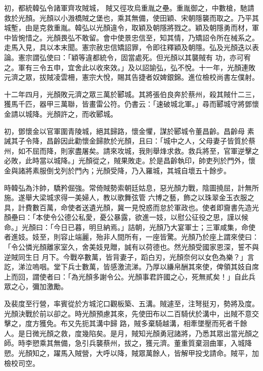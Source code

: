 \begin{pinyinscope}
 初，都統韓弘令諸軍齊攻賊城，
 賊又徑攻烏重胤之壘。重胤御之，中數槍，馳請救於光顏。光顏以小溵橋賊之堡也，乘其無備，使田穎、宋朝隱襲而取之。乃平其城塹，由是克救重胤。韓弘以光顏違令，取穎及朝隱將戮之。穎及朝隱勇而材，軍中皆惋惜之。光顏畏弘不敢留。會中使景忠信至，知其情，乃矯詔令所在械系之。走馬入見，具以本末聞。憲宗赦忠信矯詔罪，令即往釋穎及朝隱。弘及光顏迭以表論。憲宗謂弘使曰：「穎等違都統令，固當處死。但光顏以其襲賊有
 功，亦可宥之。軍有三令五申，宜舍此以收來效。」及以詔諭弘，弘不悅。十一年，光顏連敗元濟之眾，拔賊凌雲柵，憲宗大悅，賜其告捷者奴婢銀錦。進位檢校尚書左僕射。



 十二年四月，光顏敗元濟之眾三萬於郾城。其將張伯良奔於蔡州，殺其賊什二三，獲馬千匹，器甲三萬聯，皆畫雷公符。仍書云：「速破城北軍。」尋而郾城守將鄧懷金請以城降。光顏許之，而收郾城。



 初，鄧懷金以官軍圍青陵城，絕其歸路，懷金懼，謀於郾城令董昌齡。昌齡母
 素誡其子令降，昌齡因此勸懷金歸款於光顏，且曰：「城中之人，父母妻子皆質於蔡州，如不屈而降，則家盡屠矣。請來攻城，我則舉烽求救。救兵將至，官軍逆擊之必敗，此時當以城降。」光顏從之，賊果敗走。於是昌齡執印，帥吏列於門外，懷金與諸將素服倒戈列於門內；光顏受降，乃入羅城，其城自壞五十餘步。



 時韓弘為汴帥，驕矜倔強。常倚賊勢索朝廷姑息，惡光顏力戰，陰圖撓屈，計無所施。遂舉大梁城求得一美婦人，教以歌舞弦管
 六博之藝，飾之以珠翠金玉衣服之具，計費數百萬，命使者送遺光顏，冀一見悅惑而怠於軍政也。使者即齎書先造光顏壘曰：「本使令公德公私愛，憂公暴露，欲進一妓，以慰公征役之思，謹以候命。」光顏曰：「今日已暮，明旦納焉。」詰朝，光顏乃大宴軍士；三軍咸集，命使者進妓。妓至，則容止端麗，殆非人間所有，一座皆驚。光顏乃於座上謂來使曰：「令公憐光顏離家室久，舍美妓見贈，誠有以荷德也。然光顏受國家恩深，誓不與逆賊同生日
 月下。今戰卒數萬，皆背妻子，蹈白刃，光顏奈何以女色為樂？」言訖，涕泣嗚咽。堂下兵士數萬，皆感激流涕。乃厚以縑帛酬其來使，俾領其妓自席上而回，謂使者曰：「為光顏多謝令公。光顏事君許國之心，死無貳矣！」自此兵眾之心，彌加激勵。



 及裴度至行營，率賓從於方城沱口觀板築、五溝。賊遽至，注弩挺刃，勢將及度。光顏決戰於前以卻之。時光顏預慮其來，先使田布以二百騎伏於溝中，出賊不意交擊之，度方獲免。布又先扼其溝中歸
 路，賊多棄騎越溝，相牽墜壓而死者千餘人。是日微光顏之救，度幾陷矣。是月，賊知光顏勇冠諸將，乃悉其眾出當光顏之師。時李愬乘其無備，急引兵襲蔡州，拔之，獲元濟。董重質棄洄曲軍，入城降愬。光顏知之，躍馬入賊營，大呼以降，賊眾萬餘人，皆解甲投戈請命。賊平，加檢校司空。




\end{pinyinscope}
